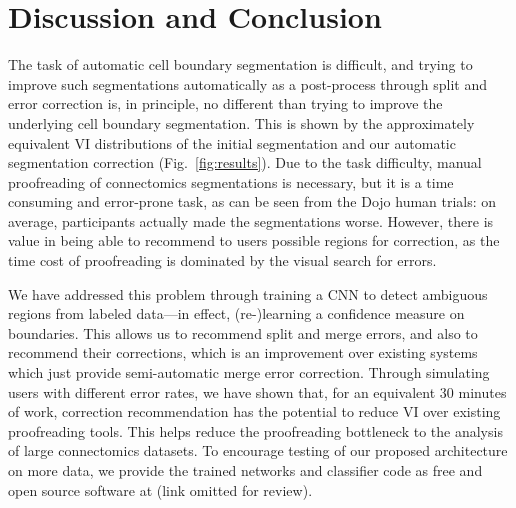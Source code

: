 \section{Discussion and Conclusion}

The task of automatic cell boundary segmentation is difficult, and trying to improve such segmentations automatically as a post-process through split and error correction is, in principle, no different than trying to improve the underlying cell boundary segmentation. This is shown by the approximately equivalent VI distributions of the initial segmentation and our automatic segmentation correction (Fig.~\ref{fig:results}). Due to the task difficulty, manual proofreading of connectomics segmentations is necessary, but it is a time consuming and error-prone task, as can be seen from the Dojo human trials: on average, participants actually made the segmentations worse. However, there is value in being able to recommend to users possible regions for correction, as the time cost of proofreading is dominated by the visual search for errors.

We have addressed this problem through training a CNN to detect ambiguous regions from labeled data---in effect, (re-)learning a confidence measure on boundaries. This allows us to recommend split and merge errors, and also to recommend their corrections, which is an improvement over existing systems which just provide semi-automatic merge error correction. Through simulating users with different error rates, we have shown that, for an equivalent 30 minutes of work, correction recommendation has the potential to reduce VI over existing proofreading tools. This helps reduce the proofreading bottleneck to the analysis of large connectomics datasets. To encourage testing of our proposed architecture on more data, we provide the trained networks and classifier code as free and open source software at (link omitted for review).



